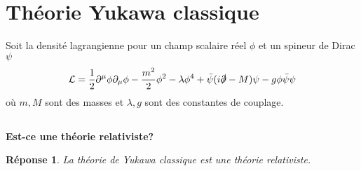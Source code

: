 \documentclass{article}
\numberwithin{equation}{section}
\theoremstyle{solution}
\newtheorem{solution}{Réponse}[section]
\begin{document}
\section{Théorie Yukawa classique}
Soit la densité lagrangienne pour un champ scalaire réel $\phi$ et un spineur de Dirac $\psi$
\begin{equation}
        \mathcal{L} = \frac{1}{2}\partial^{\mu}\phi \partial_\mu \phi - \frac{m^{2}}{2}\phi^{2} - \lambda \phi^{4} + \bar{\psi}(i \slashed{\partial} - M) \psi - g \phi\bar{\psi}\psi
\end{equation} 
où $m, M$ sont des masses et $\lambda,g$ sont des constantes de couplage.

\subsection{}
\textbf{Est-ce une théorie relativiste?}\\
\begin{solution}
       La théorie de Yukawa classique est une théorie relativiste. 
\end{solution}
\end{document}
